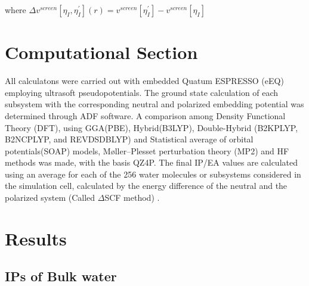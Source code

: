\documentclass[12pt,a4paper]{article}
\begin{document}
where $\Delta{v}^{screen}[\eta_I, \eta^{'}_I](r) = {v}^{screen}[\eta^{'}_I] - {v}^{screen}[\eta_I]$

\section{Computational Section}

All calculatons were carried out with embedded Quatum ESPRESSO (eEQ) employing ultrasoft pseudopotentials. The ground state calculation of each
subsystem with the corresponding neutral and polarized embedding potential was determined through ADF \cite{te2001chemistry} software. A comparison
among Density Functional Theory (DFT), using GGA(PBE), Hybrid(B3LYP), Double-Hybrid (B2KPLYP, B2NCPLYP, and REVDSDBLYP) and Statistical average of
orbital potentials(SOAP) models, Møller–Plesset perturbation theory (MP2) and HF methods was made, with the basis QZ4P. The final IP/EA values are
calculated using an average for each of the 256 water molecules or subsystems considered in the simulation cell, calculated by the energy difference
of the neutral and the polarized system (Called $\Delta$SCF method) \cite{bagus1965self,waskom2017mwaskom}.

\section{Results}
\subsection{IPs of Bulk water}
\end{document}
